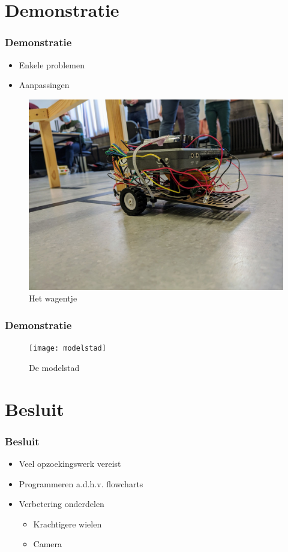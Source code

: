 \documentclass
   [kulak,aspectratio=169,<options>] %
   {kulakbeamer}
\begin{document}
\section{Demonstratie}

\begin{frame}
	\frametitle{Demonstratie}
	\begin{itemize}
		\item Enkele problemen
		\item Aanpassingen
	\end{itemize}
	\begin{figure}
		\centering
		\includegraphics[width=.4\textwidth]{fotowagen}
		\caption{Het wagentje}
	\end{figure}
\end{frame}


\begin{frame}
	\frametitle{Demonstratie}
	\begin{figure}
		\centering
		\texttt{[image: modelstad]}
		\caption{De modelstad}
	\end{figure}
\end{frame}

\section{Besluit}
\begin{frame}
\frametitle{Besluit}
	\begin{itemize}
	\item Veel opzoekingswerk vereist
	\item Programmeren a.d.h.v. flowcharts
	\item Verbetering onderdelen
		\begin{itemize}
		\item Krachtigere wielen
		\item Camera
		\end{itemize}
\end{itemize}
\end{frame}
\end{document}
